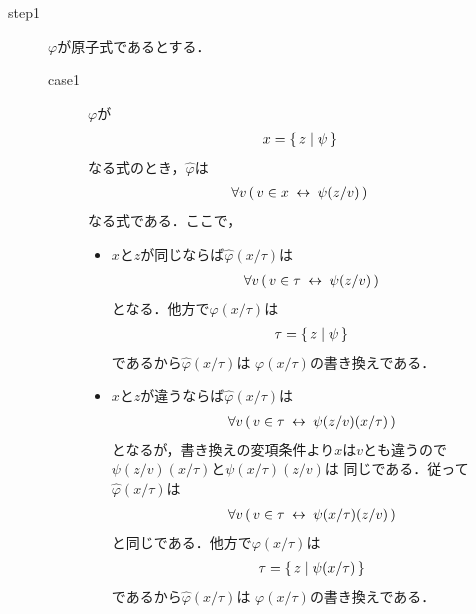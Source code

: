 	\begin{metaprf}\mbox{}
		\begin{description}
			\item[step1] $\varphi$が原子式であるとする．
				\begin{description}
					\item[case1] $\varphi$が
						\begin{align}
							x = \{\, z \mid \psi\, \}
						\end{align}
						なる式のとき，$\widehat{\varphi}$は
						\begin{align}
							\forall v\, (\, v \in x \hspace{0.25em}\leftrightarrow\hspace{0.25em} \psi(z/v)\, )
						\end{align}
						なる式である．ここで，
						\begin{itemize}
							\item $x$と$z$が同じならば$\widehat{\varphi}(x/\tau)$は
								\begin{align}
									\forall v\, (\, v \in \tau \hspace{0.25em}\leftrightarrow\hspace{0.25em} \psi(z/v)\, )
								\end{align}
								となる．他方で$\varphi(x/\tau)$は
								\begin{align}
									\tau = \{\, z \mid \psi\, \}
								\end{align}
								であるから$\widehat{\varphi}(x/\tau)$は
								$\varphi(x/\tau)$の書き換えである．
								
							\item $x$と$z$が違うならば$\widehat{\varphi}(x/\tau)$は
								\begin{align}
									\forall v\, (\, v \in \tau \hspace{0.25em}\leftrightarrow\hspace{0.25em} \psi(z/v)(x/\tau)\, )
								\end{align}
								となるが，書き換えの変項条件より$x$は$v$とも違うので
								$\psi(z/v)(x/\tau)$と$\psi(x/\tau)(z/v)$は
								同じである．従って$\widehat{\varphi}(x/\tau)$は
								\begin{align}
									\forall v\, (\, v \in \tau \hspace{0.25em}\leftrightarrow\hspace{0.25em} \psi(x/\tau)(z/v)\, )
								\end{align}
								と同じである．他方で$\varphi(x/\tau)$は
								\begin{align}
									\tau = \{\, z \mid \psi(x/\tau)\, \}
								\end{align}
								であるから$\widehat{\varphi}(x/\tau)$は
								$\varphi(x/\tau)$の書き換えである．
						\end{itemize}
						

\end{description}
\end{description}
\end{metaprf}
